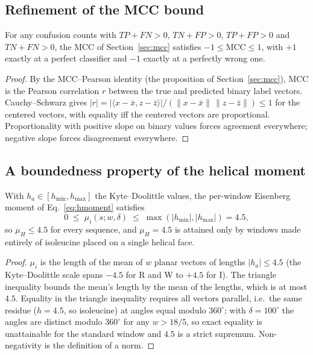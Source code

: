 \subsection{Refinement of the MCC bound}
\begin{corollary}
For any confusion counts with $TP+FN>0$, $TN+FP>0$, $TP+FP>0$ and
$TN+FN>0$, the MCC of Section~\ref{sec:mcc} satisfies
$-1 \le \mathrm{MCC} \le 1$, with $+1$ exactly at a perfect classifier and
$-1$ exactly at a perfectly wrong one.
\end{corollary}
\begin{proof}
By the MCC--Pearson identity (the proposition of
Section~\ref{sec:mcc}), MCC is the Pearson correlation $r$ between the
true and predicted binary label vectors. Cauchy--Schwarz gives
$|r| = |\langle x-\bar x, z-\bar z\rangle| /
(\|x-\bar x\|\,\|z-\bar z\|) \le 1$ for the centered vectors, with
equality iff the centered vectors are proportional. Proportionality with
positive slope on binary values forces agreement everywhere; negative
slope forces disagreement everywhere.
\end{proof}

\subsection{A boundedness property of the helical moment}
\begin{proposition}\label{prop:moment}
With $h_a \in [h_{\min}, h_{\max}]$ the Kyte--Doolittle values, the
per-window Eisenberg moment of Eq.~\eqref{eq:hmoment} satisfies
\begin{equation}
0 \;\le\; \mu_i(s; w, \delta) \;\le\; \max(|h_{\min}|, |h_{\max}|) = 4.5,
\label{eq:momentbound}
\end{equation}
so $\mu_H \le 4.5$ for every sequence, and $\mu_H = 4.5$ is attained only
by windows made entirely of isoleucine placed on a single helical face.
\end{proposition}
\begin{proof}
$\mu_i$ is the length of the mean of $w$ planar vectors of lengths
$|h_a| \le 4.5$ (the Kyte--Doolittle scale spans $-4.5$ for R and W to
$+4.5$ for I). The triangle inequality bounds the mean's length by the
mean of the lengths, which is at most $4.5$. Equality in the triangle
inequality requires all vectors parallel, i.e.\ the same residue
($h = 4.5$, so isoleucine) at angles equal modulo $360^\circ$; with
$\delta = 100^\circ$ the angles are distinct modulo $360^\circ$ for any
$w > 18/5$, so exact equality is unattainable for the standard window and
$4.5$ is a strict supremum. Non-negativity is the definition of a norm.
\end{proof}

